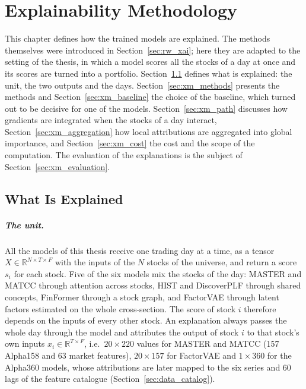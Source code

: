 
\chapter{Explainability Methodology}
\label{ch:xai_method}

This chapter defines how the trained models are explained. The methods themselves were introduced in Section~\ref{sec:rw_xai}; here they are adapted to the setting of the thesis, in which a model scores all the stocks of a day at once and its scores are turned into a portfolio. Section~\ref{sec:xm_what} defines what is explained: the unit, the two outputs and the days. Section~\ref{sec:xm_methods} presents the methods and Section~\ref{sec:xm_baseline} the choice of the baseline, which turned out to be decisive for one of the models. Section~\ref{sec:xm_path} discusses how gradients are integrated when the stocks of a day interact, Section~\ref{sec:xm_aggregation} how local attributions are aggregated into global importance, and Section~\ref{sec:xm_cost} the cost and the scope of the computation. The evaluation of the explanations is the subject of Section~\ref{sec:xm_evaluation}.

\section{What Is Explained}
\label{sec:xm_what}

\paragraph{The unit.} All the models of this thesis receive one trading day at a time, as a tensor $X \in \mathbb{R}^{N \times T \times F}$ with the inputs of the $N$ stocks of the universe, and return a score $s_i$ for each stock. Five of the six models mix the stocks of the day: MASTER and MATCC through attention across stocks, HIST and DiscoverPLF through shared concepts, FinFormer through a stock graph, and FactorVAE through latent factors estimated on the whole cross-section. The score of stock $i$ therefore depends on the inputs of every other stock. An explanation always passes the whole day through the model and attributes the output of stock $i$ to that stock's own inputs $x_i \in \mathbb{R}^{T \times F}$, i.e.\ $20 \times 220$ values for MASTER and MATCC (157 Alpha158 and 63 market features), $20 \times 157$ for FactorVAE and $1 \times 360$ for the Alpha360 models, whose attributions are later mapped to the six series and 60 lags of the feature catalogue (Section~\ref{sec:data_catalog}).

